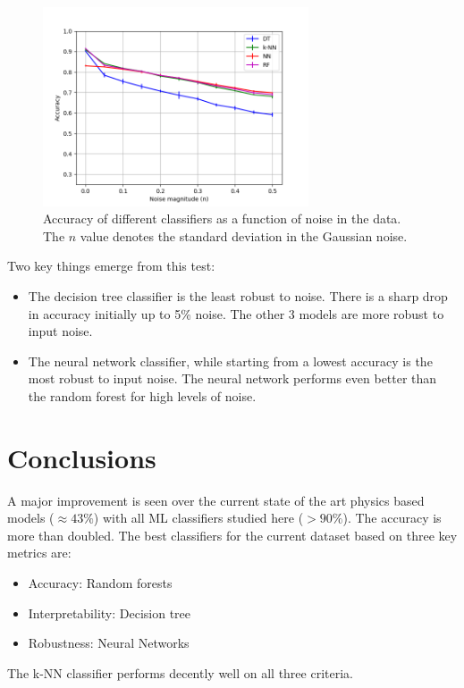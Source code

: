 \documentclass{article}
\begin{document}
\begin{figure}[h]
	\centering
	\includegraphics[width=0.7\textwidth]{figures/accuracy_with_noise.png}
	\caption{Accuracy of different classifiers as a function of noise in the data. The $n$ value denotes the standard deviation in the Gaussian noise. }
	\label{fig:noise}
\end{figure}

Two key things emerge from this test:
\begin{itemize}
\item The decision tree classifier is the least robust to noise. There is a sharp drop in accuracy initially up to 5\% noise. The other 3 models are more robust to input noise.
\item The neural network classifier, while starting from a lowest accuracy is the most robust to input noise. The neural network performs even better than the random forest for high levels of noise.
\end{itemize}

\section{Conclusions}

A major improvement is seen over the current state of the art physics based models ($\approx 43\%$) with all ML classifiers studied here ($> 90\%$). The accuracy is more than doubled. The best classifiers for the current dataset based on three key metrics are:
\begin{itemize}
\item Accuracy: Random forests
\item Interpretability: Decision tree
\item Robustness: Neural Networks
\end{itemize}
The k-NN classifier performs decently well on all three criteria.
\end{document}
